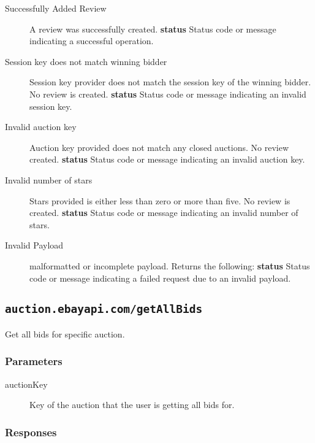 \documentclass{article}
\newcommand{\code}[1]{\colorbox{light-gray}{\texttt{#1}}}
\begin{document}
\begin{description}
    \item[Successfully Added Review] A review was successfully created.
        \subitem\textbf{status} Status code or message indicating a successful
        operation.

    \item[Session key does not match winning bidder] Session key provider does
        not match the session key of the winning bidder. No review is created.
        \subitem\textbf{status} Status code or message indicating an invalid
        session key.

    \item[Invalid auction key] Auction key provided does not match any closed
        auctions. No review created.
        \subitem\textbf{status} Status code or message indicating an invalid
        auction key.

    \item[Invalid number of stars] Stars provided is either less than zero or
        more than five. No review is created.
        \subitem\textbf{status} Status code or message indicating an invalid
        number of stars.

    \item[Invalid Payload] malformatted or incomplete payload. Returns the
        following:
        \subitem\textbf{status} Status code or message indicating a failed
        request due to an invalid payload.
\end{description}

\subsection{\code{auction.ebayapi.com/getAllBids}}
Get all bids for specific auction.

\subsubsection{Parameters}
\begin{description}
    \item[auctionKey] Key of the auction that the user is getting all bids for.
\end{description}

\subsubsection{Responses}
\end{document}
